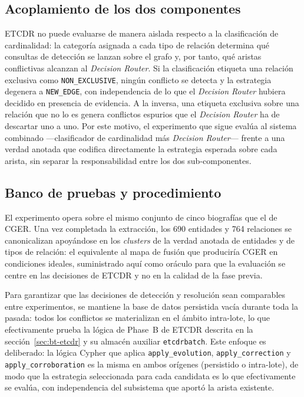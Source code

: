 \subsection{Acoplamiento de los dos componentes}

ETCDR no puede evaluarse de manera aislada respecto a la clasificación de cardinalidad: la categoría asignada a cada tipo de relación determina qué consultas de detección se lanzan sobre el grafo y, por tanto, qué aristas conflictivas alcanzan al \emph{Decision Router}. Si la clasificación etiqueta una relación exclusiva como \texttt{NON\_EXCLUSIVE}, ningún conflicto se detecta y la estrategia degenera a \texttt{NEW\_EDGE}, con independencia de lo que el \emph{Decision Router} hubiera decidido en presencia de evidencia. A la inversa, una etiqueta exclusiva sobre una relación que no lo es genera conflictos espurios que el \emph{Decision Router} ha de descartar uno a uno. Por este motivo, el experimento que sigue evalúa al sistema combinado ---clasificador de cardinalidad más \emph{Decision Router}--- frente a una verdad anotada que codifica directamente la estrategia esperada sobre cada arista, sin separar la responsabilidad entre los dos sub-componentes.

\subsection{Banco de pruebas y procedimiento}

El experimento opera sobre el mismo conjunto de cinco biografías que el de CGER. Una vez completada la extracción, los 690 entidades y 764 relaciones se canonicalizan apoyándose en los \emph{clusters} de la verdad anotada de entidades y de tipos de relación: el equivalente al mapa de fusión que produciría CGER en condiciones ideales, suministrado aquí como oráculo para que la evaluación se centre en las decisiones de ETCDR y no en la calidad de la fase previa.

Para garantizar que las decisiones de detección y resolución sean comparables entre experimentos, se mantiene la base de datos persistida vacía durante toda la pasada: todos los conflictos se materializan en el ámbito intra-lote, lo que efectivamente prueba la lógica de Phase~B de ETCDR descrita en la sección~\ref{sec:bt-etcdr} y su almacén auxiliar \texttt{etcdrbatch}. Este enfoque es deliberado: la lógica Cypher que aplica \texttt{apply\_evolution}, \texttt{apply\_correction} y \texttt{apply\_corroboration} es la misma en ambos orígenes (persistido o intra-lote), de modo que la estrategia seleccionada para cada candidata es lo que efectivamente se evalúa, con independencia del subsistema que aportó la arista existente.

